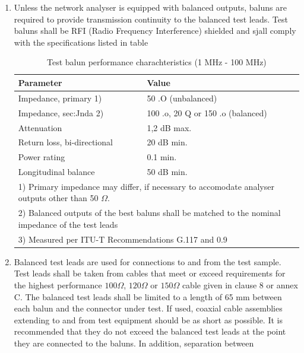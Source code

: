 \begin{enumerate}
    \item {Unless the network analyser is equipped with balanced outputs, baluns are required to
    provide transmission continuity to the balanced test leads. Test baluns shall be RFI (Radio
    Frequency Interference) shielded and sjall comply with the specifications listed in table}
    \begin{longtable}[c]{| p{4cm} | p{4cm} |}
        \caption{Test balun performance charachteristics (1 MHz - 100 MHz)} \\
        \hline
        {\bf Parameter} & {\bf Value} \\
        \hline
        Impedance, primary 1) & 50 .O (unbalanced) \\
        \hline
        Impedance, sec:Jnda 2) & 100 .o, 20 Q or 150 .o (balanced) \\
        \hline
        Attenuation & 1,2 dB max. \\
        \hline
        Return loss, bi-directional & 20 dB min. \\
        \hline
        Power rating & 0.1 min. \\
        \hline
        Longitudinal balance & 50 dB min. \\
        \hline
        \multicolumn{2}{|p{8cm}|}{
            1) Primary impedance may differ, if necessary to accomodate analyser outputs other than 50 $\Omega$.
            }\\
            \multicolumn{2}{|p{8cm}|}{
            2) Balanced outputs of the best baluns shall be matched to the nominal impedance of the test leads
            }\\
            \multicolumn{2}{|p{8cm}|}{
            3) Measured per ITU-T Recommendations G.117 and 0.9
            }\\
        \hline
    \end{longtable}
    \item {Balanced test leads are used for connections to and from the test sample. Test leads shall
    be taken from cables that meet or exceed requirements for the highest performance $100 \Omega$, $120 \Omega$ or
    $150 \Omega$ cable given in clause 8 or annex C}. The balanced test leads shall be limited to a length of 65
    mm between each balun and the connector under test. If used, coaxial cable assemblies extending to
    and from test equipment should be as short as possible. It is recommended that they do not exceed
    the balanced test leads at the point they are connected to the baluns. In addition, separation between

\end{enumerate}
